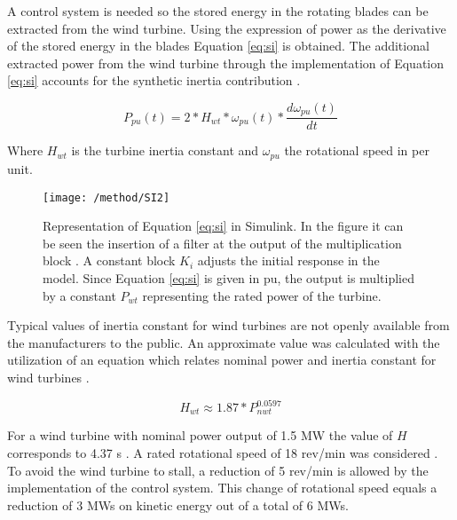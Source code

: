 	A control system is needed so the stored energy in the rotating blades can be extracted from the wind turbine. Using the expression of power as the derivative of the stored energy in the blades Equation \eqref{eq:si} is obtained. The additional extracted power from the wind turbine through the implementation of Equation \eqref{eq:si} accounts for the synthetic inertia contribution \cite{NREL.2012}.

\begin{equation}
	\label{eq:si}
	P_{pu}(t)=2*H_{wt}*\omega_{pu}(t)*\dfrac{d\omega_{pu}(t)}{dt}
\end{equation}


Where  $H_{wt}$ is the turbine inertia constant and $\omega_{pu}$ the rotational speed in per unit.

\begin{figure}[h]
	\centering
	\texttt{[image: /method/SI2]}
	\caption{Representation of Equation \eqref{eq:si} in Simulink. In the figure it can be seen the insertion of a filter at the output of the multiplication block \cite{GeneralElectricInternational.2013, nesje2015need}. A constant block $ K_i $ adjusts the initial response in the model. Since Equation \eqref{eq:si} is given in pu, the output is multiplied by a constant $ P_{wt} $ representing the rated power of the turbine.}
	\label{fig:synthetic}
\end{figure}

Typical values of inertia constant for wind turbines are not openly available from the manufacturers to the public. An approximate value was calculated with the utilization of an equation which relates nominal power and inertia constant for wind turbines \cite{GonzalezRodriguez.2007}.

\begin{equation}
	\label{eq:wtinertia}
	H_{wt}\approx1.87*P_{nwt}^{0.0597}
\end{equation}


For a wind turbine with nominal power output of 1.5 MW the value of $ H $ corresponds to 4.37 s \cite{Wu.2013}. A rated rotational speed of 18 rev/min was considered \cite{Wu.2013}. To avoid the wind turbine to stall, a reduction of 5 rev/min is allowed by the implementation of the control system. This change of rotational speed equals a reduction of 3 MWs on kinetic energy out of a total of 6 MWs.

